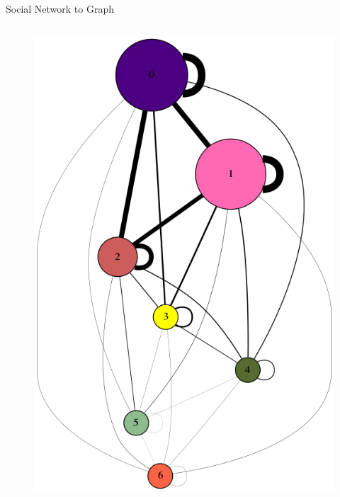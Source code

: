 \begin{frame}[t]{Social Network to Graph}
\begin{columns}
\begin{column}{0.5\textwidth}
\begin{figure}[h]
        \includegraphics[scale=0.15]{img/gdot.png}
        \end{figure}
        \end{column}
    \end{columns}
\end{frame}

%
%
%
%




